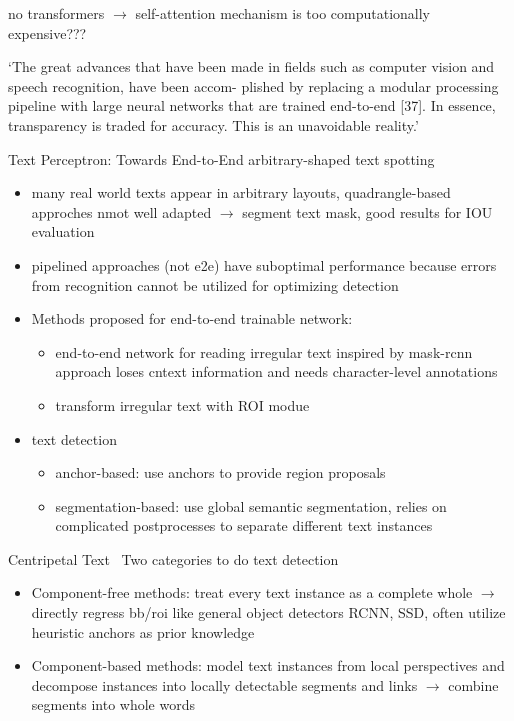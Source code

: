 no transformers $\rightarrow$ self-attention mechanism is too computationally expensive???

`The great advances that have been made in fields such as computer vision and speech recognition,
have been accom- plished by replacing a modular processing pipeline with large neural networks
that are trained end-to-end [37]. In essence, transparency is traded for accuracy.
This is an unavoidable reality.'\citep{arpteg_software_2018}

Text Perceptron: Towards End-to-End arbitrary-shaped text spotting~\citep{qiao_text_2021}
\begin{itemize}
    \item many real world texts appear in arbitrary layouts, quadrangle-based approches nmot well adapted
        $\rightarrow$ segment text mask, good results for IOU evaluation
    \item pipelined approaches (not e2e) have suboptimal performance because errors from recognition
        cannot be utilized for optimizing detection
    \item Methods proposed for end-to-end trainable network:
        \begin{itemize}
            \item end-to-end network for reading irregular text inspired by mask-rcnn
                approach loses cntext information and needs character-level annotations
            \item transform irregular text with ROI modue
        \end{itemize}
    \item text detection
        \begin{itemize}
            \item anchor-based: use anchors to provide region proposals
            \item segmentation-based: use global semantic segmentation, relies on complicated
                postprocesses to separate different text instances
        \end{itemize}
\end{itemize}

Centripetal Text~\citep{sheng_centripetaltext_2021}
Two categories to do text detection
\begin{itemize}
    \item Component-free methods: treat every text instance as a complete whole $\rightarrow$ directly
        regress bb/roi like general object detectors RCNN, SSD, often utilize heuristic anchors
        as prior knowledge
    \item Component-based methods: model text instances from local perspectives and decompose instances
        into locally detectable segments and links $\rightarrow$ combine segments into whole words
\end{itemize}

